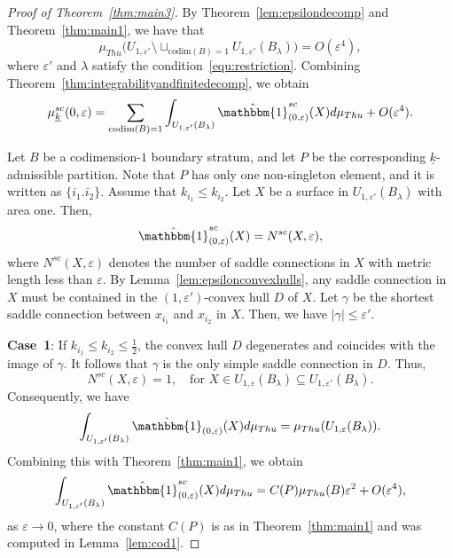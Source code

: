 \documentclass{compositio}
\numberwithin{equation}{section}
\numberwithin{figure}{section}
\theoremstyle{definition}
\theoremstyle{plain}
\begin{document}
{\begin{proof}[Proof of Theorem~\ref{thm:main3}]
    By Theorem~\ref{lem:epsilondecomp} and Theorem~\ref{thm:main1}, we have that
    $$
    \mu_{Thu}\big(U_{1,\varepsilon'}\setminus\sqcup_{\mathrm{codim}(B) =1} U_{1,\varepsilon'}(B_\lambda)\big) = O(\varepsilon^4),
    $$
    where $\varepsilon'$ and $\lambda$ satisfy the condition~\eqref{equ:restriction}.
    Combining Theorem~\ref{thm:integrabilityandfinitedecomp}, we obtain
    \begin{equation}\label{equ:asyintermediate}
        \mu^{sc}_{\underline{k}}(0,\varepsilon) = \sum\limits_{\mathrm{codim}(B)=1}\int_{ U_{1,\varepsilon'}(B_\lambda)}\hat{\mathbbm{1}}^{sc}_{(0,\varepsilon)}(X)d\mu_{Thu} + O(\varepsilon^4).
    \end{equation}

    Let $B$ be a codimension-$1$ boundary stratum, and let $P$ be the corresponding $\underline{k}$-admissible partition. Note that $P$ has only one non-singleton element, and it is written as $\{i_1.i_2\}$. Assume that $k_{i_1}\le k_{i_2}$. Let $X$ be a surface in $U_{1,\varepsilon'}(B_\lambda)$ with area one. Then,
    $$
    \hat{\mathbbm{1}}^{sc}_{(0,\varepsilon)}(X) = N^{sc}(X,\varepsilon),
    $$
    where $N^{sc}(X,\varepsilon)$ denotes the number of saddle connections in $X$ with metric length less than $\varepsilon$. By Lemma~\ref{lem:epsilonconvexhulls}, any saddle connection in $X$ must be contained in the $(1,\varepsilon')$-convex hull $D$ of $X$. Let $\gamma$ be the shortest saddle connection between $x_{i_1}$ and $x_{i_2}$ in $X$. Then, we have $|\gamma|\leq \varepsilon'$.

    \textbf{Case~1}: If $k_{i_1} \leq k_{i_2} \leq \frac{1}{2}$, the convex hull $D$ degenerates and coincides with the image of $\gamma$. It follows that $\gamma$ is the only simple saddle connection in $D$. Thus, 
    \begin{equation}\label{equ:countingcase1}
            N^{sc}(X,\varepsilon) = 1,\quad\text{for }X\in U_{1,\varepsilon}(B_\lambda)\subseteq U_{1,\varepsilon'}(B_\lambda).
    \end{equation}
    Consequently, we have
    $$
    \int_{ U_{1,\varepsilon'}(B_\lambda)}\hat{\mathbbm{1}}_{(0,\varepsilon)}(X)d\mu_{Thu} = \mu_{Thu}(U_{1,\varepsilon}(B_\lambda)).
    $$ 
    Combining this with Theorem~\ref{thm:main1}, we obtain
    \begin{equation}
        \int_{ U_{1,\varepsilon'}(B_\lambda)}\hat{\mathbbm{1}}^{sc}_{(0,\varepsilon)}(X)d\mu_{Thu} = C(P)\mu_{Thu}(B)\varepsilon^2 + O(\varepsilon^4),
    \end{equation}
    as $\varepsilon\to0$, where
    the constant $C(P)$ is as in Theorem~\ref{thm:main1} and was computed in Lemma~\ref{lem:cod1}.
    

\end{proof}}
\end{document}
